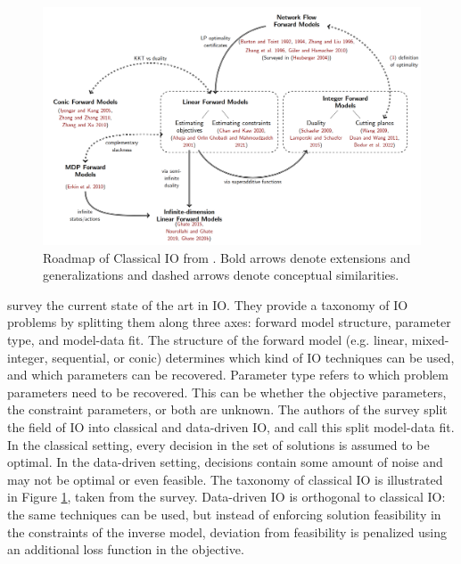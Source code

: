 \begin{figure}[ht]
    \centering
    \includegraphics[width=\textwidth]{res/img/classical-io-roadmap}
    \caption{Roadmap of Classical IO from \cite{chanInverseOptimizationTheory2022}. Bold arrows denote extensions and
generalizations and dashed arrows denote conceptual similarities.}
    \label{fig:litrev:io-roadmap}
\end{figure}

\cite{chanInverseOptimizationTheory2022} survey the current state of the art in IO. They provide a taxonomy of IO problems by splitting them along three axes: forward model structure, parameter type, and model-data fit. The structure of the forward model (e.g. linear, mixed-integer, sequential, or conic) determines which kind of IO techniques can be used, and which parameters can be recovered. Parameter type refers to which problem parameters need to be recovered. This can be whether the objective parameters, the constraint parameters, or both are unknown. The authors of the survey split the field of IO into classical and data-driven IO, and call this split model-data fit. In the classical setting, every decision in the set of solutions is assumed to be optimal. In the data-driven setting, decisions contain some amount of noise and may not be optimal or even feasible. The taxonomy of classical IO is illustrated in Figure \ref{fig:litrev:io-roadmap}, taken from the survey. Data-driven IO is orthogonal to classical IO: the same techniques can be used, but instead of enforcing solution feasibility in the constraints of the inverse model, deviation from feasibility is penalized using an additional loss function in the objective.

